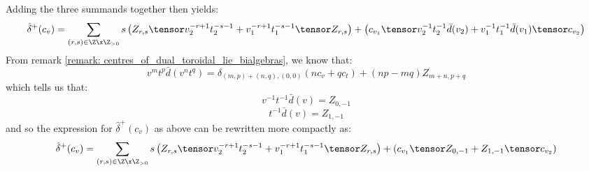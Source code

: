                         Adding the three summands together then yields:
                            $$\hat{\delta}^+(c_v) = \sum_{(r, s) \in \Z \x \Z_{> 0}} s \left( Z_{r, s} \tensor v_2^{-r + 1} t_2^{-s - 1} + v_1^{-r + 1} t_1^{-s - 1} \tensor Z_{r, s} \right) + \left( c_{v_1} \tensor v_2^{-1} t_2^{-1} \bar{d}(v_2) + v_1^{-1} t_1^{-1} \bar{d}(v_1) \tensor c_{v_2} \right)$$
                        From remark \ref{remark: centres_of_dual_toroidal_lie_bialgebras}, we know that:
                            $$v^m t^p \bar{d}(v^n t^q) = \delta_{(m, p) + (n, q), (0, 0)} ( n c_v + q c_t ) + (np - mq) Z_{m + n, p + q}$$
                        which tells us that:
                            $$v^{-1} t^{-1} \bar{d}(v) = Z_{0, -1}$$
                            $$t^{-1} \bar{d}(v) = Z_{1, -1}$$
                        and so the expression for $\hat{\delta}^+(c_v)$ as above can be rewritten more compactly as:
                            $$\hat{\delta}^+(c_v) = \sum_{(r, s) \in \Z \x \Z_{> 0}} s \left( Z_{r, s} \tensor v_2^{-r + 1} t_2^{-s - 1} + v_1^{-r + 1} t_1^{-s - 1} \tensor Z_{r, s} \right) + \left( c_{v_1} \tensor Z_{0, -1} + Z_{1, -1} \tensor c_{v_2} \right)$$